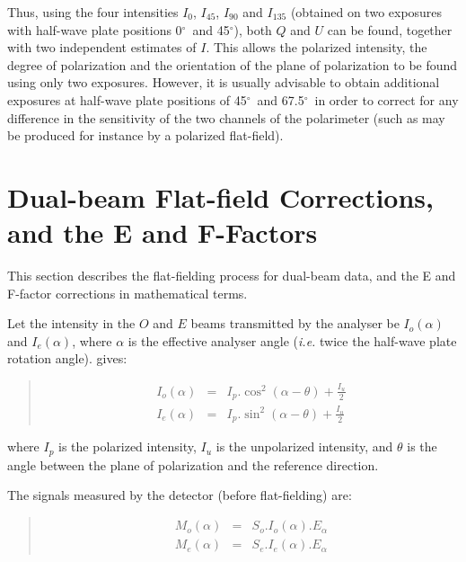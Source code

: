 \documentclass[twoside,11pt]{starlink}
\newenvironment{myquote}{\begin{quote}\begin{small}}{\end{small}\end{quote}}
\providecommand{\dgs}{\hbox{$^\circ$}}
\begin{document}
Thus, using the four intensities $I_{0}$, $I_{45}$, $I_{90}$ and $I_{135}$
(obtained on two exposures with half-wave plate positions 0\dgs\ and
45\dgs), both $Q$ and $U$ can be found, together with two
independent estimates of $I$. This allows the polarized intensity, the
degree of polarization and the orientation of the plane of polarization to
be found using only two exposures. However, it is usually advisable to
obtain additional exposures at half-wave plate positions of 45\dgs\ and
67.5\dgs\ in order to correct for any difference in the sensitivity of
the two channels of the polarimeter (such as may be produced for instance
by a polarized flat-field).

\newpage
\section{\label{APP:FFCOR}Dual-beam
Flat-field Corrections, and the E and F-Factors}
This section describes the flat-fielding process for dual-beam data, and the
E and F-factor corrections in mathematical terms.

Let the intensity in the $O$ and $E$ beams transmitted by the analyser be
$I_{o}(\alpha)$ and $I_{e}(\alpha)$, where $\alpha$ is the effective
analyser angle (\emph{i.e.} twice the half-wave plate rotation angle).
 gives:

\begin{myquote}
\begin{eqnarray*}
  I_{o}(\alpha) & = & I_{p}.\cos^{2}( \alpha - \theta ) + \frac{I_{u}}{2} \\
  I_{e}(\alpha) & = & I_{p}.\sin^{2}( \alpha - \theta ) + \frac{I_{u}}{2}
\end{eqnarray*}
\end{myquote}

where $I_{p}$ is the polarized intensity, $I_{u}$ is the unpolarized
intensity, and $\theta$ is the angle between the plane of polarization
and the reference direction.

The signals measured by the detector (before flat-fielding) are:

\begin{myquote}
\begin{eqnarray*}
  M_{o}(\alpha) & = & S_{o}.I_{o}(\alpha).E_{\alpha} \\
  M_{e}(\alpha) & = & S_{e}.I_{e}(\alpha).E_{\alpha}
\end{eqnarray*}
\end{myquote}
\end{document}
